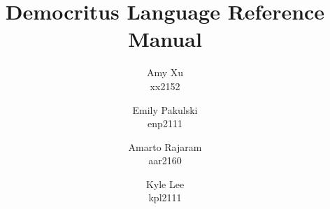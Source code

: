 \documentclass{report}
\author{Amy Xu \\ \small{xx2152} \and Emily Pakulski \\ \small{enp2111} \and Amarto Rajaram \\ \small{aar2160} \and Kyle Lee\\ \small{kpl2111}}
\title{Democritus Language Reference Manual}
\begin{document}
	\maketitle
	\tableofcontents
	\pagebreak
	
	
	
\end{document}
